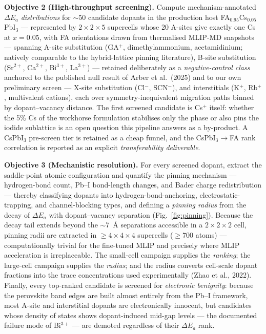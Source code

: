 \documentclass[11pt,a4paper]{article}
\begin{document}
\textbf{Objective 2 (High-throughput screening).} Compute mechanism-annotated
$\Delta E_a$ \emph{distributions} for $\sim$50 candidate dopants in the production
host FA$_{0.95}$Cs$_{0.05}$PbI$_3$ --- represented by $2\times2\times5$ supercells
whose 20 A-sites give exactly one Cs at $x=0.05$, with FA orientations drawn from
thermalised MLIP-MD snapshots --- spanning A-site substitution (GA$^+$,
dimethylammonium, acetamidinium; natively comparable to the hybrid-lattice pinning
literature), B-site substitution (Sr$^{2+}$, Ca$^{2+}$, Bi$^{3+}$, La$^{3+}$) ---
retained deliberately as a \emph{negative-control class} anchored to the published
null result of Arber et al.\ (2025) and to our own preliminary screen --- X-site
substitution (Cl$^-$, SCN$^-$), and interstitials (K$^+$, Rb$^+$, multivalent
cations), each over symmetry-inequivalent migration paths binned by dopant--vacancy
distance. The first screened candidate is Cs$^+$ itself: whether the 5\% Cs of the
workhorse formulation stabilises only the phase or also pins the iodide sublattice is
an open question this pipeline answers as a by-product. A CsPbI$_3$ pre-screen tier
is retained as a cheap funnel, and the CsPbI$_3\!\to$FA rank correlation is reported
as an explicit \emph{transferability deliverable}.

\textbf{Objective 3 (Mechanistic resolution).} For every screened dopant, extract the
saddle-point atomic configuration and quantify the pinning mechanism --- hydrogen-bond
count, Pb--I bond-length changes, and Bader charge redistribution --- thereby
classifying dopants into hydrogen-bond-anchoring, electrostatic-trapping, and
channel-blocking types, and defining a \emph{pinning radius} from the decay of
$\Delta E_a$ with dopant--vacancy separation (Fig.~\ref{fig:pinning}). Because the
decay tail extends beyond the $\sim$7~\AA{} separations accessible in a
$2\times2\times2$ cell, pinning radii are extracted in $\geq4\times4\times4$ supercells
($\geq$700 atoms) --- computationally trivial for the fine-tuned MLIP and precisely
where MLIP acceleration is irreplaceable. The small-cell campaign supplies the
\emph{ranking}; the large-cell campaign supplies the \emph{radius}; and the radius
converts cell-scale dopant fractions into the trace concentrations used experimentally
(Zhao et al., 2022). Finally, every top-ranked candidate is screened for
\emph{electronic benignity}: because the perovskite band edges are built almost
entirely from the Pb--I framework, most A-site and interstitial dopants are
electronically innocent, but candidates whose density of states shows dopant-induced
mid-gap levels --- the documented failure mode of Bi$^{3+}$ --- are demoted regardless
of their $\Delta E_a$ rank.
\end{document}
